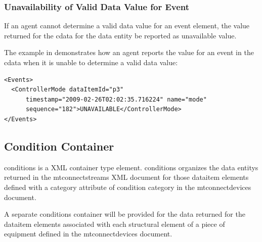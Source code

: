 \documentclass{mtconnect}	%
\begin{document}
\subsubsection{Unavailability of Valid Data Value for Event}

If an \gls{agent} cannot determine a \gls{valid data value} for an \gls{event} element, the value returned for the \gls{cdata} for the \gls{data entity} \must be reported as \gls{unavailable value}.

The example in  demonstrates how an \gls{agent} reports the value for an \gls{event} in the \gls{cdata} when it is unable to determine a \gls{valid data value}:  

\begin{lstlisting}[firstnumber=1,escapechar=|,%
    caption={Example of Event Element when data value is UNAVAILABLE},label={lst:example-of-event-element-unavailable}]
<Events>
  <ControllerMode dataItemId="p3" 
      timestamp="2009-02-26T02:02:35.716224" name="mode"
      sequence="182">UNAVAILABLE</ControllerMode>
</Events>
\end{lstlisting}

\pagebreak

\subsection{Condition Container}

\gls{conditions} is a XML container type element.  \gls{conditions} organizes the \glspl{data entity} returned in the \gls{mtconnectstreams} XML document for those \gls{dataitem} elements defined with a \gls{category} attribute of \gls{condition category} in the \gls{mtconnectdevices} document.

A separate \gls{conditions} container will be provided for the data returned for the \gls{dataitem} elements associated with each \gls{structural element} of a piece of equipment defined in the \gls{mtconnectdevices} document.
\end{document}
